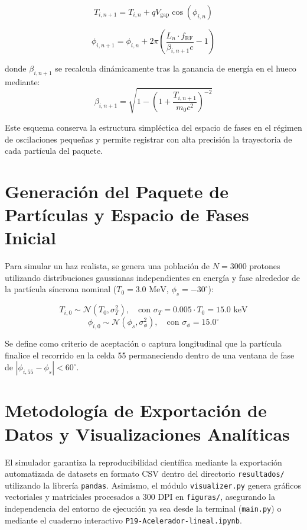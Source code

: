 \begin{equation}
T_{i, n+1} = T_{i, n} + q V_{\text{gap}} \cos(\phi_{i, n})
\end{equation}

\begin{equation}
\phi_{i, n+1} = \phi_{i, n} + 2\pi \left( \frac{L_n \cdot f_{\text{RF}}}{\beta_{i, n+1} c} - 1 \right)
\end{equation}

donde $\beta_{i, n+1}$ se recalcula dinámicamente tras la ganancia de energía en el hueco mediante:
\begin{equation}
\beta_{i, n+1} = \sqrt{1 - \left( 1 + \frac{T_{i, n+1}}{m_0 c^2} \right)^{-2}}
\end{equation}

Este esquema conserva la estructura simpléctica del espacio de fases en el régimen de oscilaciones pequeñas y permite registrar con alta precisión la trayectoria de cada partícula del paquete.

\section{Generación del Paquete de Partículas y Espacio de Fases Inicial}
Para simular un haz realista, se genera una población de $N = 3000$ protones utilizando distribuciones gaussianas independientes en energía y fase alrededor de la partícula síncrona nominal ($T_0 = 3.0\text{ MeV}$, $\phi_s = -30^\circ$):

\begin{equation}
T_{i, 0} \sim \mathcal{N}\left(T_0, \sigma_T^2\right), \quad \text{con } \sigma_T = 0.005 \cdot T_0 = 15.0\text{ keV}
\end{equation}
\begin{equation}
\phi_{i, 0} \sim \mathcal{N}\left(\phi_s, \sigma_\phi^2\right), \quad \text{con } \sigma_\phi = 15.0^\circ
\end{equation}

Se define como criterio de aceptación o captura longitudinal que la partícula finalice el recorrido en la celda 55 permaneciendo dentro de una ventana de fase de $|\phi_{i, 55} - \phi_s| < 60^\circ$.

\section{Metodología de Exportación de Datos y Visualizaciones Analíticas}
El simulador garantiza la reproducibilidad científica mediante la exportación automatizada de datasets en formato CSV dentro del directorio \texttt{resultados/} utilizando la librería \texttt{pandas}. Asimismo, el módulo \texttt{visualizer.py} genera gráficos vectoriales y matriciales procesados a 300 DPI en \texttt{figuras/}, asegurando la independencia del entorno de ejecución ya sea desde la terminal (\texttt{main.py}) o mediante el cuaderno interactivo \texttt{P19-Acelerador-lineal.ipynb}.